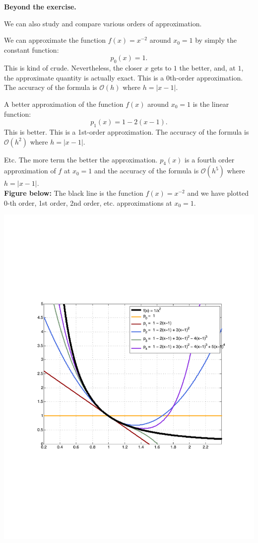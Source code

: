 \documentclass[pdftex,11pt]{article}
\begin{document}
\textbf{\color{blue} Beyond the exercise.} 

We can also study and compare various orders of approximation.

We can approximate the function $f(x)=x^{-2}$ around $x_0=1$ by simply the constant function:
$$p_0(x) = 1.$$ 
This is kind of crude. Nevertheless, the closer $x$ gets to $1$ the better, and, at $1$, the approximate quantity is actually exact. 
This is a 0th-order approximation. The accuracy of the formula is $\mathcal{O}(h)$ where $h=|x-1|$.

A better approximation of the function $f(x)$ around $x_0=1$ is the linear function:
$$p_1(x) =  1 - 2 (x-1).$$
This is better. 
This is a 1st-order approximation. The accuracy of the formula is $\mathcal{O}(h^2)$  where $h=|x-1|$.

Etc. The more term the better the approximation. $p_4(x)$ is a fourth order approximation of $f$ at $x_0=1$  and the accuracy of the formula is $\mathcal{O}(h^5)$  where $h=|x-1|$.\\

\textbf{Figure below:} The black line is the function $f(x)=x^{-2}$ and we have plotted 0-th order, 1st order, 2nd order, etc. approximations at  $x_0=1$.

\includegraphics[width=.7\textwidth]{EX_0_5_6_fig4}
\end{document}

